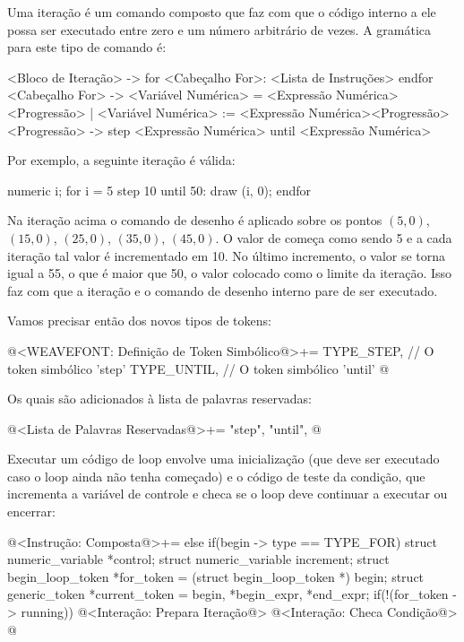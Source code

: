 {{{{{{

Uma iteração é um comando composto  que faz com que o
código interno a ele possa ser executado entre zero e um número
arbitrário de vezes. A gramática para este tipo de comando é:

\alinhaverbatim
<Bloco de Iteração> -> for <Cabeçalho For>:
                         <Lista de Instruções>
                       endfor
<Cabeçalho For> -> <Variável Numérica>  = <Expressão Numérica><Progressão> |
                   <Variável Numérica> := <Expressão Numérica><Progressão>
<Progressão> -> step <Expressão Numérica> until <Expressão Numérica>
\alinhanormal

Por exemplo, a seguinte iteração é válida:

\alinhaverbatim
numeric i;
for i = 5 step 10 until 50:
  draw (i, 0);
endfor
\alinhanormal

Na iteração acima o comando de desenho  é aplicado
sobre os pontos $(5, 0)$, $(15, 0)$, $(25, 0)$, $(35, 0)$, $(45,
0)$. O valor de  começa como sendo 5 e a cada iteração
tal valor é incrementado em 10. No último incremento, o valor se torna
igual a 55, o que é maior que 50, o valor colocado como o limite da
iteração. Isso faz com que a iteração e o comando de desenho interno
pare de ser executado.

Vamos precisar então dos novos tipos de tokens:

\iniciocodigo
@<WEAVEFONT: Definição de Token Simbólico@>+=
TYPE_STEP,  // O token simbólico 'step'
TYPE_UNTIL, // O token simbólico 'until'
@
\fimcodigo

Os quais são adicionados à lista de palavras reservadas:

\iniciocodigo
@<Lista de Palavras Reservadas@>+=
"step", "until",
@
\fimcodigo

Executar um código de loop envolve uma inicialização (que deve ser
executado caso o loop ainda não tenha começado) e o código de teste da
condição, que incrementa a variável de controle e checa se o loop deve
continuar a executar ou encerrar:

\iniciocodigo
@<Instrução: Composta@>+=
else if(begin -> type == TYPE_FOR){
  struct numeric_variable *control;
  struct numeric_variable increment;
  struct begin_loop_token *for_token = (struct begin_loop_token *) begin;
  struct generic_token *current_token = begin, *begin_expr, *end_expr;
  if(!(for_token -> running)){
    @<Interação: Prepara Iteração@>
  }
  @<Interação: Checa Condição@>
}
@
\fimcodigo

}}}}}}
